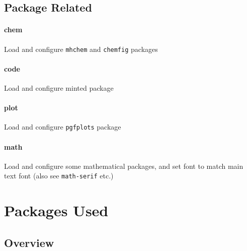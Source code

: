 \documentclass[solid,math,chem,code,plot,gloss]{bmc}
\begin{document}
\subsection{Package Related}

\paragraph{\ttfamily chem}
Load and configure \texttt{mhchem} and \texttt{chemfig} packages

\paragraph{\ttfamily code}
Load and configure minted package

\paragraph{\ttfamily plot}
Load and configure \texttt{pgfplots} package

\paragraph{\ttfamily math}
Load and configure some mathematical packages, and set font to match main text font (also see \texttt{math-serif} etc.)

\newpage
\section{Packages Used}

\subsection{Overview}
\end{document}
